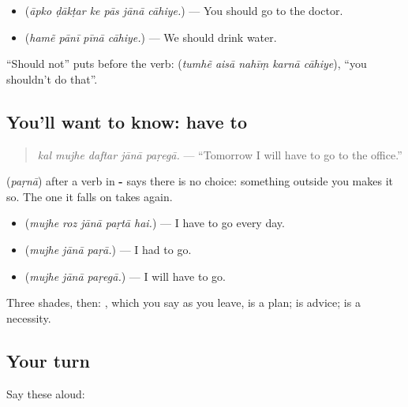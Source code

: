 \begin{itemize}
\raggedright
  \item \textbf{     } (\emph{āpko ḍākṭar ke pās jānā cāhiye.}) — You should go to the doctor.
  \item \textbf{   } (\emph{hamẽ pānī pīnā cāhiye.}) — We should drink water.
\end{itemize}

\textquotedblleft{}Should not\textquotedblright{} puts \textbf{} before the verb: \textbf{    } (\emph{tumhẽ aisā nahīṃ karnā cāhiye}), \textquotedblleft{}you shouldn't do that\textquotedblright{}.

\subsection*{You'll want to know: have to}
\begin{quote}
\textbf{    }
\end{quote}

\begin{quote}
\emph{kal mujhe daftar jānā paṛegā.} — \textquotedblleft{}Tomorrow I will have to go to the office.\textquotedblright{}
\end{quote}

\textbf{} (\emph{paṛnā}) after a verb in \textbf{-} says there is no choice: something outside you makes it so. The one it falls on takes \textbf{} again.

\begin{itemize}
\raggedright
  \item \textbf{    } (\emph{mujhe roz jānā paṛtā hai.}) — I have to go every day.
  \item \textbf{  } (\emph{mujhe jānā paṛā.}) — I had to go.
  \item \textbf{  } (\emph{mujhe jānā paṛegā.}) — I will have to go.
\end{itemize}

Three shades, then: \textbf{ }, which you say as you leave, is a plan; \textbf{ } is advice; \textbf{ } is a necessity.

\subsection*{Your turn}
Say these aloud:


